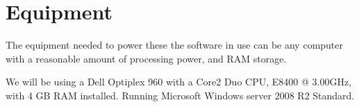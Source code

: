 \section{Equipment}
\label{sec:equipment}


The equipment needed to power these the software in use can be any computer with a reasonable amount of processing power, and RAM storage.

We will be using a Dell Optiplex 960 with a Core2 Duo CPU, E8400 @ 3.00GHz, with 4 GB RAM installed. Running Microsoft Windows server 2008 R2 Standard. 

